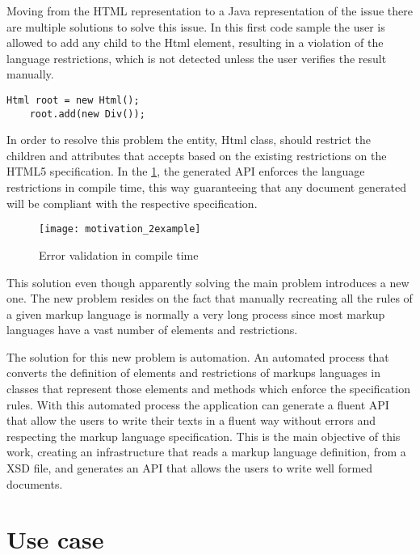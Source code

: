 \noindent
Moving from the \ac{HTML} representation to a Java representation of the issue there are multiple solutions to solve this issue. In this first code sample the user is allowed to add any child to the Html element, resulting in a violation of the language restrictions, which is not detected unless the user verifies the result manually.

\lstset{language=Java}
\begin{lstlisting}[caption={Error validation in runtime},captionpos=b]
	Html root = new Html();
	root.add(new Div());
\end{lstlisting}

\noindent
In order to resolve this problem the entity, Html class, should restrict the children and attributes that accepts based on the existing restrictions on the \ac{HTML}5 specification. In the \ref{motivation_2example}, the generated \ac{API} enforces the language restrictions in compile time, this way guaranteeing that any document generated will be compliant with the respective specification.

\begin{figure}[ht]
	\centering
	\texttt{[image: motivation\_2example]}
	\caption{Error validation in compile time}
	\label{motivation_2example}
\end{figure}

\noindent
This solution even though apparently solving the main problem introduces a new one. The new problem resides on the fact that manually recreating all the rules of a given markup language is normally a very long process since most markup languages have a vast number of elements and restrictions. 

\noindent
The solution for this new problem is automation. An automated process that converts the definition of elements and restrictions of markups languages in classes that represent those elements and methods which enforce the specification rules. With this automated process the application can generate a fluent \ac{API} that allow the users to write their texts in a fluent way without errors and respecting the markup language specification. This is the main objective of this work, creating an infrastructure that reads a markup language definition, from a \ac{XSD} file, and generates an \ac{API} that allows the users to write well formed documents.

\section{Use case}

